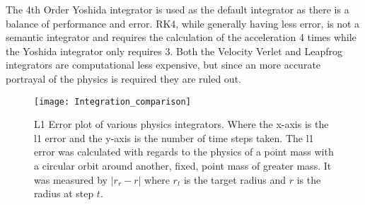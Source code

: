 The 4th Order Yoshida integrator is used as the default integrator as there is a balance of performance and error. RK4, while generally having less error, is not a semantic integrator and requires the calculation of the acceleration 4 times while the Yoshida integrator only requires 3. Both the Velocity Verlet and Leapfrog integrators are computational less expensive, but since an more accurate portrayal of the physics is required they are ruled out.

\begin{figure} 
\centering 
\texttt{[image: Integration\_comparison]}
\caption{L1 Error plot of various physics integrators. Where the x-axis is the l1 error and the y-axis is the number of time steps taken. The l1 error was calculated with regards to the physics of a point mass with a circular orbit around another, fixed, point mass of greater mass. It was measured by $|r_r-r|$ where $r_t$ is the target radius and $r$ is the radius at step $t$.} \label{fig:integratorerror}
\end{figure} 